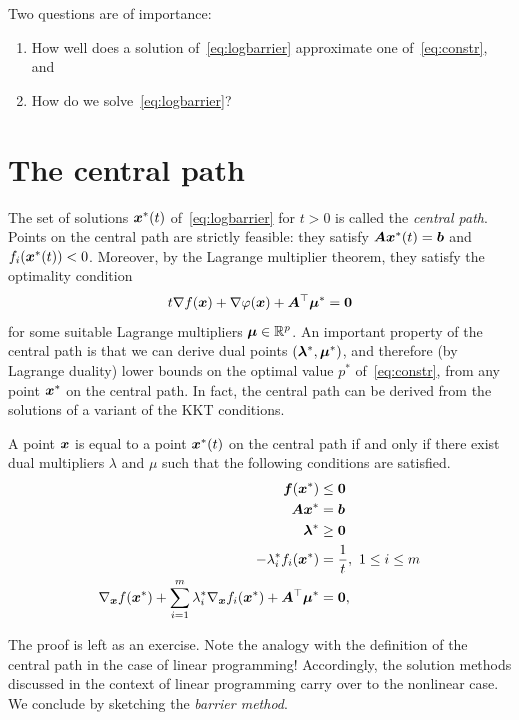  Two questions are of importance:
\begin{enumerate}
 \item How well does a solution of~\eqref{eq:logbarrier} approximate one of~\eqref{eq:constr}, and
 \item How do we solve~\eqref{eq:logbarrier}?
\end{enumerate}

\section{The central path}
The set of solutions $\bm{x}^*(t)$ of~\eqref{eq:logbarrier} for $t>0$ is called the {\em central path}. Points on the central path are strictly feasible: they satisfy $\bm{A}\bm{x}^*(t)=\bm{b}$ and $f_i(\bm{x}^*(t))<0$. Moreover, by the Lagrange multiplier theorem, they satisfy the optimality condition
\begin{equation*}
 t\nabla f(\bm{x})+\nabla \varphi(\bm{x})+\bm{A}^{\top}\bm{\mu}^*=\bm{0}
\end{equation*}
for some suitable Lagrange multipliers $\bm{\mu}\in \mathbb{R}^p$. An important property of the central path is that we can derive dual points $(\bm{\lambda}^*,\bm{\mu}^*)$, and therefore (by Lagrange duality) lower bounds on the optimal value $p^*$ of~\eqref{eq:constr}, from any point $\bm{x}^*$ on the central path. In fact, the central path can be derived from the solutions of a variant of the KKT conditions.

\begin{lemma}
 A point $\bm{x}$ is equal to a point $\bm{x}^*(t)$ on the central path if and only if there exist dual multipliers $\lambda$ and $\mu$ such that the following conditions are satisfied.
 \begin{align*}
\begin{split}
  \bm{f}(\bm{x}^*) & \leq \bm{0}\\
  \bm{A}\bm{x}^* & = \bm{b}\\
  \bm{\lambda}^*&\geq \bm{0}\\
  -\lambda_i^*f_i(\bm{x}^*) & =\frac{1}{t}, \ 1\leq i\leq m\\
  \nabla_{\bm{x}} f(\bm{x}^*)+\sum_{i=1}^m \lambda_i^* \nabla_{\bm{x}}f_i(\bm{x}^*)+\bm{A}^{\top}\bm{\mu}^* &= \bm{0},
 \end{split}
 \end{align*}
\end{lemma}

The proof is left as an exercise. Note the analogy with the definition of the central path in the case of linear programming! Accordingly, the solution methods discussed in the context of linear programming carry over to the nonlinear case. We conclude by sketching the {\em barrier method}.

